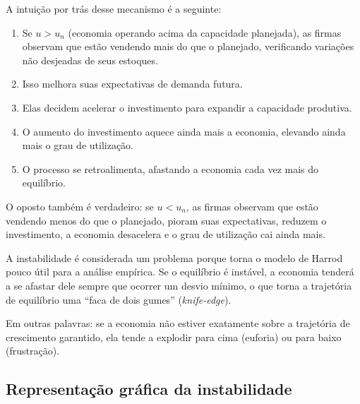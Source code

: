 \documentclass[
  brazilian,
  letterpaper,
  DIV=11,
  numbers=noendperiod]{scrreprt}
\providecommand{\tightlist}{%
  \setlength{\itemsep}{0pt}\setlength{\parskip}{0pt}}
\begin{document}
A intuição por trás desse mecanismo é a seguinte:

\begin{enumerate}
\def\labelenumi{\arabic{enumi}.}
\tightlist
\item
  Se \(u > u_n\) (economia operando acima da capacidade planejada), as
  firmas observam que estão vendendo mais do que o planejado,
  verificando variações não desjeadas de seus estoques.
\item
  Isso melhora suas expectativas de demanda futura.
\item
  Elas decidem acelerar o investimento para expandir a capacidade
  produtiva.
\item
  O aumento do investimento aquece ainda mais a economia, elevando ainda
  mais o grau de utilização.
\item
  O processo se retroalimenta, afastando a economia cada vez mais do
  equilíbrio.
\end{enumerate}

O oposto também é verdadeiro: se \(u < u_n\), as firmas observam que
estão vendendo menos do que o planejado, pioram suas expectativas,
reduzem o investimento, a economia desacelera e o grau de utilização cai
ainda mais.

\begin{tcolorbox}[enhanced jigsaw, arc=.35mm, bottomrule=.15mm, bottomtitle=1mm, breakable, colback=white, colbacktitle=quarto-callout-warning-color!10!white, colframe=quarto-callout-warning-color-frame, coltitle=black, left=2mm, leftrule=.75mm, opacityback=0, opacitybacktitle=0.6, rightrule=.15mm, title=\textcolor{quarto-callout-warning-color}{\faExclamationTriangle}\hspace{0.5em}{Por que a instabilidade é um problema?}, titlerule=0mm, toprule=.15mm, toptitle=1mm]

A instabilidade é considerada um problema porque torna o modelo de
Harrod pouco útil para a análise empírica. Se o equilíbrio é instável, a
economia tenderá a se afastar dele sempre que ocorrer um desvio mínimo,
o que torna a trajetória de equilíbrio uma ``faca de dois gumes''
(\emph{knife-edge}).

Em outras palavras: se a economia não estiver exatamente sobre a
trajetória de crescimento garantido, ela tende a explodir para cima
(euforia) ou para baixo (frustração).

\end{tcolorbox}

\subsection{Representação gráfica da
instabilidade}\label{representauxe7uxe3o-gruxe1fica-da-instabilidade}
\end{document}
